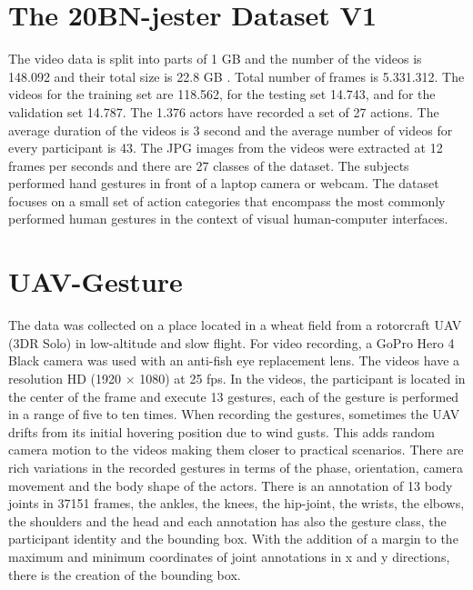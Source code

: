 \documentclass[12pt]{book}
\begin{document}
\section{The 20BN-jester Dataset V1}
The video data is split into parts of 1 GB and the number of the videos is 148.092 and their total size is 22.8 GB \cite{JES}. Total number of frames is 5.331.312. The videos for the training set are 118.562, for the testing set 14.743, and for the validation set 14.787. The 1.376 actors have recorded a set of 27 actions. The average duration of the videos is 3 second and the average number of videos for every participant is 43. The JPG images from the videos were extracted at 12 frames per seconds and there are 27 classes of the dataset. The subjects performed hand gestures in front of a laptop camera or webcam. The dataset focuses on a small set of action categories that encompass the most commonly performed human gestures in the context of visual human-computer interfaces.

\section{UAV-Gesture}
The data \cite{ASA2018} was collected on a place located in a wheat field from a rotorcraft UAV (3DR Solo) in low-altitude and slow flight. For video recording, a GoPro Hero 4 Black camera was used with an anti-fish eye replacement lens. The videos have a resolution HD (1920 × 1080) at 25 fps. In the videos, the participant is located in the center of the frame and execute 13 gestures, each of the gesture is performed in a range of five to ten times. When recording the gestures, sometimes the UAV drifts from its initial hovering position due to wind gusts. This adds random camera motion to the videos making them closer to practical scenarios. There are rich variations in the recorded gestures in terms of the phase, orientation, camera movement and the body shape of the actors. There is an annotation  of 13 body joints in 37151 frames, the ankles, the knees, the hip-joint, the wrists, the elbows, the shoulders and the head and each annotation has also the gesture class, the participant identity and the bounding box. With the addition of a margin to the maximum and minimum coordinates of joint annotations in x and y directions, there is the creation of the bounding box.
\end{document}
